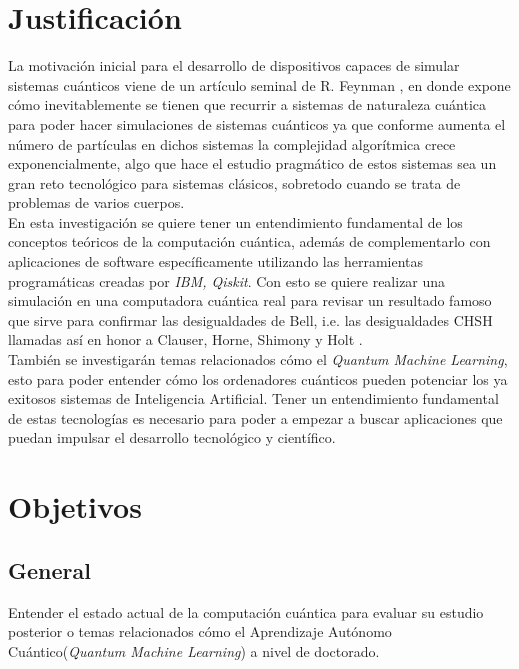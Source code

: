 \documentclass[a4paper]{article}
\begin{document}
\section{Justificación}
La motivación inicial para el desarrollo de dispositivos capaces de simular sistemas cuánticos viene de un artículo seminal de R. Feynman \cite{Feynman}, en donde expone cómo inevitablemente se tienen que recurrir a sistemas de naturaleza cuántica para poder hacer simulaciones de sistemas cuánticos ya que conforme aumenta el número de partículas en dichos sistemas la complejidad algorítmica crece exponencialmente, algo que hace el estudio pragmático de estos sistemas sea un gran reto tecnológico para sistemas clásicos, sobretodo cuando se trata de problemas de varios cuerpos.\\

En esta investigación se quiere tener un entendimiento fundamental de los conceptos teóricos de la computación cuántica, además de complementarlo con aplicaciones de software específicamente utilizando las herramientas programáticas creadas por \textit{IBM, Qiskit}. Con esto se quiere realizar una simulación en una computadora cuántica real para revisar un resultado famoso que sirve para confirmar las desigualdades de Bell, i.e. las desigualdades CHSH llamadas así en honor a Clauser, Horne, Shimony y Holt \cite{Clauser}.\\

También se investigarán temas relacionados cómo el \textit{Quantum Machine Learning}, esto para poder entender cómo los ordenadores cuánticos pueden potenciar los ya exitosos sistemas de Inteligencia Artificial. Tener un entendimiento fundamental de estas tecnologías es necesario para poder a empezar a buscar aplicaciones que puedan impulsar el desarrollo tecnológico y científico.
\section{Objetivos}
\subsection{General}
Entender el estado actual de la computación cuántica para evaluar su estudio posterior o temas relacionados cómo el Aprendizaje Autónomo Cuántico(\emph{Quantum Machine Learning}) a nivel de doctorado.
\end{document}
